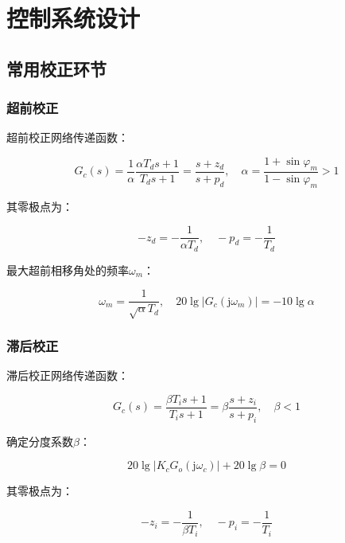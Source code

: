 \documentclass[cn, blue, normal, 12pt]{elegantnote}
\begin{document}
\section{控制系统设计}

\subsection{常用校正环节}

\subsubsection{超前校正}

超前校正网络传递函数：

\begin{equation}
    G_c(s)=\frac{1}{\alpha}\frac{\alpha T_d s+1}{T_d s+1}=\frac{s+z_d}{s+p_d}, \quad \alpha=\frac{1+\sin{\varphi_m}}{1-\sin{\varphi_m}}>1
\end{equation}

其零极点为：

\begin{equation}
    -z_d=-\frac{1}{\alpha T_d}, \quad -p_d=-\frac{1}{T_d}
\end{equation}

最大超前相移角处的频率$\omega_m$：

\begin{equation}
    \omega_m=\frac{1}{\sqrt{\alpha}T_d}, \quad 20\lg{|G_c(\mathrm{j}\omega_m)|}=-10\lg{\alpha}
\end{equation}

\subsubsection{滞后校正}

滞后校正网络传递函数：

\begin{equation}
    G_c(s)=\frac{\beta T_i s+1}{T_i s+1}=\beta\frac{s+z_i}{s+p_i}, \quad \beta<1
\end{equation}

确定分度系数$\beta$：

\begin{equation}
    20\lg{|K_c G_o(\mathrm{j}\omega_c)|}+20\lg{\beta}=0
\end{equation}

其零极点为：

\begin{equation}
    -z_i=-\frac{1}{\beta T_i}, \quad -p_i=-\frac{1}{T_i}
\end{equation}
\end{document}
